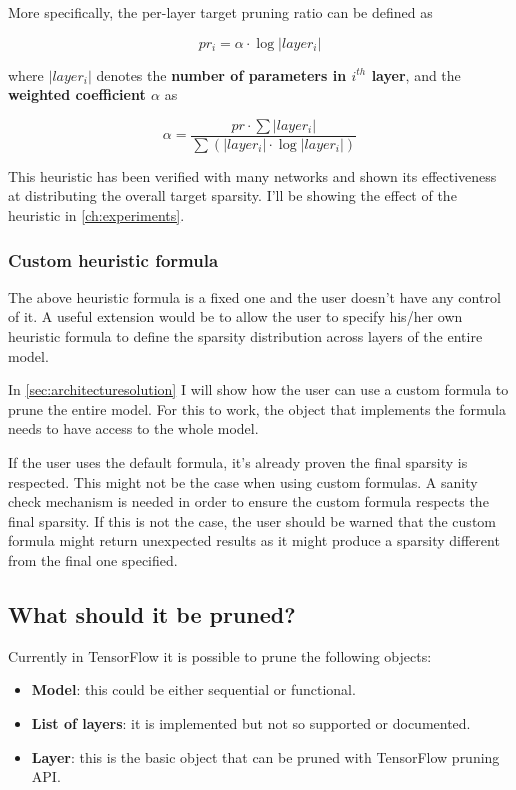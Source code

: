 More specifically, the per-layer target pruning ratio can be defined as

\begin{equation}
    pr_i = \alpha \cdot \log|layer_i|
\end{equation}

where $|layer_i|$ denotes the \textbf{number of parameters in $i^{th}$ layer},
and the \textbf{weighted coefficient $\alpha$} as

\begin{equation}
    \alpha = \frac{pr \cdot \sum|layer_i|}{\sum(|layer_i| \cdot \log|layer_i|)}
\end{equation}

This heuristic has been verified with many networks and shown its effectiveness
at distributing the overall target sparsity\cite{wu2018pocketflow}. I'll be
showing the effect of the heuristic in \autoref{ch:experiments}.

\subsubsection{Custom heuristic formula}
The above heuristic formula is a fixed one and the user doesn't have any
control of it. A useful extension would be to allow the user to specify his/her
own heuristic formula to define the sparsity distribution across layers of the
entire model.

In \autoref{sec:architecturesolution} I will show how the user can use a custom
formula to prune the entire model. For this to work, the object that implements
the formula needs to have access to the whole model.

If the user uses the default formula, it's already proven the final sparsity is
respected. This might not be the case when using custom formulas.
A sanity check mechanism is needed in order to ensure the custom formula
respects the final sparsity. If this is not the case, the user should be warned
that the custom formula might return unexpected results as it might produce a
sparsity different from the final one specified.

\subsection{What should it be pruned?}
Currently in TensorFlow it is possible to prune the following objects:
\begin{itemize}
    \item \textbf{Model}: this could be either sequential or functional.
    \item \textbf{List of layers}: it is implemented but not so supported or
        documented.
    \item \textbf{Layer}: this is the basic object that can be pruned with
        TensorFlow pruning API\@.
\end{itemize}

